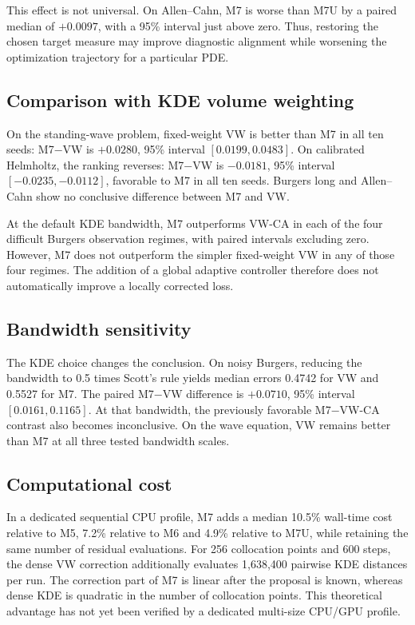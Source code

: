 \documentclass[
  11pt,
]{article}
\begin{document}
This effect is not universal. On Allen--Cahn, M7 is worse than M7U by a
paired median of \(+0.0097\), with a 95\% interval just above zero.
Thus, restoring the chosen target measure may improve diagnostic
alignment while worsening the optimization trajectory for a particular
PDE.

\hypertarget{comparison-with-kde-volume-weighting}{%
\subsection{Comparison with KDE volume
weighting}\label{comparison-with-kde-volume-weighting}}

On the standing-wave problem, fixed-weight VW is better than M7 in all
ten seeds: M7−VW is \(+0.0280\), 95\% interval \([0.0199,0.0483]\). On
calibrated Helmholtz, the ranking reverses: M7−VW is \(-0.0181\), 95\%
interval \([-0.0235,-0.0112]\), favorable to M7 in all ten seeds.
Burgers long and Allen--Cahn show no conclusive difference between M7
and VW.

At the default KDE bandwidth, M7 outperforms VW-CA in each of the four
difficult Burgers observation regimes, with paired intervals excluding
zero. However, M7 does not outperform the simpler fixed-weight VW in any
of those four regimes. The addition of a global adaptive controller
therefore does not automatically improve a locally corrected loss.

\hypertarget{bandwidth-sensitivity}{%
\subsection{Bandwidth sensitivity}\label{bandwidth-sensitivity}}

The KDE choice changes the conclusion. On noisy Burgers, reducing the
bandwidth to 0.5 times Scott's rule yields median errors 0.4742 for VW
and 0.5527 for M7. The paired M7−VW difference is \(+0.0710\), 95\%
interval \([0.0161,0.1165]\). At that bandwidth, the previously
favorable M7−VW-CA contrast also becomes inconclusive. On the wave
equation, VW remains better than M7 at all three tested bandwidth
scales.

\hypertarget{computational-cost}{%
\subsection{Computational cost}\label{computational-cost}}

In a dedicated sequential CPU profile, M7 adds a median 10.5\% wall-time
cost relative to M5, 7.2\% relative to M6 and 4.9\% relative to M7U,
while retaining the same number of residual evaluations. For 256
collocation points and 600 steps, the dense VW correction additionally
evaluates 1,638,400 pairwise KDE distances per run. The correction part
of M7 is linear after the proposal is known, whereas dense KDE is
quadratic in the number of collocation points. This theoretical
advantage has not yet been verified by a dedicated multi-size CPU/GPU
profile.
\end{document}
